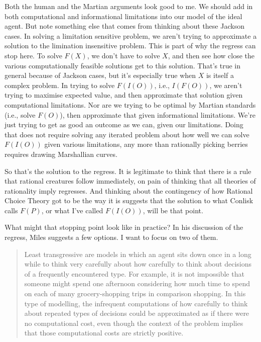 \documentclass[11pt,]{book}
\begin{document}
Both the human and the Martian arguments look good to me. We should add in both computational and informational limitations into our model of the ideal agent. But note something else that comes from thinking about these Jackson cases. In solving a limitation sensitive problem, we aren't trying to approximate a solution to the limination insensitive problem. This is part of why the regress can stop here. To solve \(F(X)\), we don't have to solve \(X\), and then see how close the various computationally feasible solutions get to this solution. That's true in general because of Jackson cases, but it's especially true when \(X\) is itself a complex problem. In trying to solve \(F(I(O))\), i.e., \(I(F(O))\), we aren't trying to maximise expected value, and then approximate that solution given computational limitations. Nor are we trying to be optimal by Martian standards (i.e., solve \(F(O)\)), then approximate that given informational limitations. We're just trying to get as good an outcome as we can, given our limitations. Doing that does not require solving any iterated problem about how well we can solve \(F(I(O))\) given various limitations, any more than rationally picking berries requires drawing Marshallian curves.

So that's the solution to the regress. It is legitimate to think that there is a rule that rational creatures follow immediately, on pain of thinking that all theories of rationality imply regresses. And thinking about the contingency of how Rational Choice Theory got to be the way it is suggests that the solution to what Conlisk calls \(F(P)\), or what I've called \(F(I(O))\), will be that point.

What might that stopping point look like in practice? In his discussion of the regress, Miles \citet{Kimball2015} suggests a few options. I want to focus on two of them.

\begin{quote}
Least transgressive are models in which an agent sits down once in a long while to think very carefully about how carefully to think about decisions of a frequently encountered type. For example, it is not impossible that someone might spend one afternoon considering how much time to spend on each of many grocery-shopping trips in comparison shopping. In this type of modelling, the infrequent computations of how carefully to think about repeated types of decisions could be approximated as if there were no computational cost, even though the context of the problem implies that those computational costs are strictly positive. \citep[ 174]{Kimball2015}
\end{quote}
\end{document}
